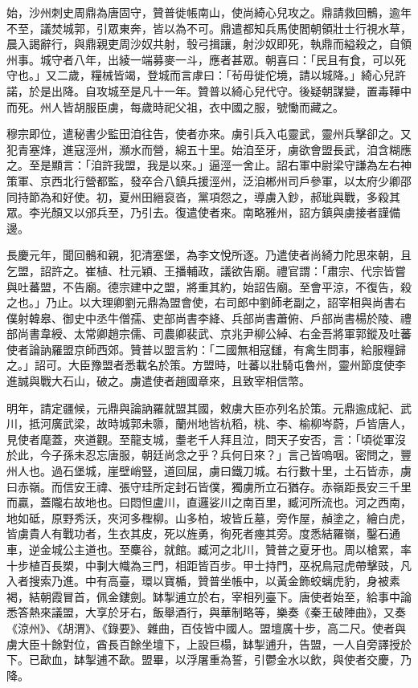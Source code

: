 \begin{pinyinscope}
 始，沙州刺史周鼎為唐固守，贊普徙帳南山，使尚綺心兒攻之。鼎請救回鶻，逾年不至，議焚城郭，引眾東奔，皆以為不可。鼎遣都知兵馬使閻朝領壯士行視水草，晨入謁辭行，與鼎親吏周沙奴共射，彀弓揖讓，射沙奴即死，執鼎而縊殺之，自領州事。城守者八年，出綾一端募麥一斗，應者甚眾。朝喜曰：「民且有食，可以死守也。」又二歲，糧械皆竭，登城而言虖曰：「茍毋徙佗境，請以城降。」綺心兒許諾，於是出降。自攻城至是凡十一年。贊普以綺心兒代守。後疑朝謀變，置毒鞾中而死。州人皆胡服臣虜，每歲時祀父祖，衣中國之服，號慟而藏之。



 穆宗即位，遣秘書少監田洎往告，使者亦來。虜引兵入屯靈武，靈州兵擊卻之。又犯青塞烽，進寇涇州，瀕水而營，綿五十里。始洎至牙，虜欲會盟長武，洎含糊應之。至是顯言：「洎許我盟，我是以來。」逼涇一舍止。詔右軍中尉梁守謙為左右神策軍、京西北行營都監，發卒合八鎮兵援涇州，泛洎郴州司戶參軍，以太府少卿邵同持節為和好使。初，夏州田縉裒沓，黨項怨之，導虜入鈔，郝玼與戰，多殺其眾。李光顏又以邠兵至，乃引去。復遣使者來。南略雅州，詔方鎮與虜接者謹備邊。



 長慶元年，聞回鶻和親，犯清塞堡，為李文悅所逐。乃遣使者尚綺力陀思來朝，且乞盟，詔許之。崔植、杜元穎、王播輔政，議欲告廟。禮官謂：「肅宗、代宗皆嘗與吐蕃盟，不告廟。德宗建中之盟，將重其約，始詔告廟。至會平涼，不復告，殺之也。」乃止。以大理卿劉元鼎為盟會使，右司郎中劉師老副之，詔宰相與尚書右僕射韓皋、御史中丞牛僧孺、吏部尚書李絳、兵部尚書蕭俯、戶部尚書楊於陵、禮部尚書韋綬、太常卿趙宗儒、司農卿裴武、京兆尹柳公綽、右金吾將軍郭鏦及吐蕃使者論訥羅盟京師西郊。贊普以盟言約：「二國無相寇讎，有禽生問事，給服糧歸之。」詔可。大臣豫盟者悉載名於策。方盟時，吐蕃以壯騎屯魯州，靈州節度使李進誠與戰大石山，破之。虜遣使者趙國章來，且致宰相信幣。



 明年，請定疆候，元鼎與論訥羅就盟其國，敕虜大臣亦列名於策。元鼎逾成紀、武川，抵河廣武梁，故時城郭未隳，蘭州地皆杭稻，桃、李、榆柳岑蔚，戶皆唐人，見使者麾蓋，夾道觀。至龍支城，耋老千人拜且泣，問天子安否，言：「頃從軍沒於此，今子孫未忍忘唐服，朝廷尚念之乎？兵何日來？」言己皆嗚咽。密問之，豐州人也。過石堡城，崖壁峭豎，道回屈，虜曰鐵刀城。右行數十里，土石皆赤，虜曰赤嶺。而信安王禕、張守珪所定封石皆僕，獨虜所立石猶存。赤嶺距長安三千里而贏，蓋隴右故地也。曰悶怛盧川，直邏娑川之南百里，臧河所流也。河之西南，地如砥，原野秀沃，夾河多檉柳。山多柏，坡皆丘墓，旁作屋，赬塗之，繪白虎，皆虜貴人有戰功者，生衣其皮，死以旌勇，徇死者瘞其旁。度悉結羅嶺，鑿石通車，逆金城公主道也。至麋谷，就館。臧河之北川，贊普之夏牙也。周以槍累，率十步植百長槊，中剚大幟為三門，相距皆百步。甲士持門，巫祝鳥冠虎帶擊豉，凡入者搜索乃進。中有高臺，環以寶楯，贊普坐帳中，以黃金飾蛟螭虎豹，身被素褐，結朝霞冒首，佩金鏤劍。缽掣逋立於右，宰相列臺下。唐使者始至，給事中論悉答熱來議盟，大享於牙右，飯舉酒行，與華制略等，樂奏《秦王破陣曲》，又奏《涼州》、《胡渭》、《錄要》、雜曲，百伎皆中國人。盟壇廣十步，高二尺。使者與虜大臣十餘對位，酋長百餘坐壇下，上設巨榻，缽掣逋升，告盟，一人自旁譯授於下。已歃血，缽掣逋不歃。盟畢，以浮屠重為誓，引鬱金水以飲，與使者交慶，乃降。




\end{pinyinscope}
